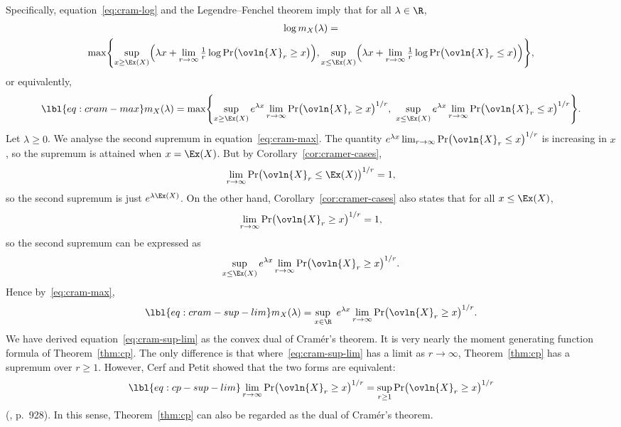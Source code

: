Specifically, equation~\eqref{eq:cram-log} and the Legendre--Fenchel
theorem imply that for all $\lambda \in \R$,
% 
\begin{multline*}
\log m_X(\lambda)       
= \\
\max \Biggl\{
\sup_{x \geq \Ex(X)} \Bigl(
\lambda x + \lim_{r \to \infty} \tfrac{1}{r} \log 
\Pr\bigl(\ovln{X}_r \geq x\bigr)
\Bigr), 
\sup_{x \leq \Ex(X)} \Bigl(
\lambda x + \lim_{r \to \infty} \tfrac{1}{r} \log 
\Pr\bigl(\ovln{X}_r \leq x\bigr)
\Bigr)
\Biggr\},
\end{multline*}
% 
or equivalently,
% 
\begin{equation}
\lbl{eq:cram-max}
m_X(\lambda)
=
\max \Biggl\{
\sup_{x \geq \Ex(X)} 
e^{\lambda x} \lim_{r \to \infty} 
\Pr\bigl(\ovln{X}_r \geq x\bigr)^{1/r},
\
\sup_{x \leq \Ex(X)} 
e^{\lambda x} \lim_{r \to \infty} 
\Pr\bigl(\ovln{X}_r \leq x\bigr)^{1/r}
\Biggr\}.
\end{equation}
% 
Let $\lambda \geq 0$.  We analyse the second supremum in
equation~\eqref{eq:cram-max}.  The quantity $e^{\lambda x} \lim_{r \to
  \infty} \Pr\bigl(\ovln{X}_r \leq x\bigr)^{1/r}$ is increasing in $x$, so
the supremum is attained when $x = \Ex(X)$.  But by
Corollary~\ref{cor:cramer-cases},
\[
\lim_{r \to \infty} 
\Pr\bigl(
\ovln{X}_r \leq \Ex(X)
\bigr)^{1/r}
=
1,
\]
so the second supremum is just $e^{\lambda\Ex(X)}$.  On the other hand,
Corollary~\ref{cor:cramer-cases}\bref{part:cramer-cases-1} also states that
for all $x \leq \Ex(X)$, 
\[
\lim_{r \to \infty} 
\Pr\bigl(
\ovln{X}_r \geq x
\bigr)^{1/r}
=
1,
\]
so the second supremum can be expressed as
\[
\sup_{x \leq \Ex(X)} e^{\lambda x} 
\lim_{r \to \infty} \Pr\bigl(\ovln{X}_r \geq x\bigr)^{1/r}.
\]
Hence by~\eqref{eq:cram-max},
% 
\begin{equation}
\lbl{eq:cram-sup-lim}
m_X(\lambda)
=
\sup_{x \in \R} \ e^{\lambda x} \lim_{r \to \infty} 
\Pr\bigl(\ovln{X}_r \geq x\bigr)^{1/r}.
\end{equation}
% 
We have derived equation~\eqref{eq:cram-sup-lim} as the convex dual of
Cram\'er's theorem.  It is very nearly the moment generating function
formula of Theorem~\ref{thm:cp}.  The only difference is that
where~\eqref{eq:cram-sup-lim} has a limit as $r \to \infty$,
Theorem~\ref{thm:cp} has a supremum over $r \geq 1$.  However, Cerf and
Petit showed that the two forms are equivalent:
% 
\begin{equation}
\lbl{eq:cp-sup-lim}
\lim_{r \to \infty} \Pr\bigl(\ovln{X}_r \geq x\bigr)^{1/r}
=
\sup_{r \geq 1} \Pr\bigl(\ovln{X}_r \geq x\bigr)^{1/r}
\end{equation}
% 
(\cite{CePe}, p.~928).  In this sense, Theorem~\ref{thm:cp} can also be
regarded as the dual of Cram\'er's theorem.

